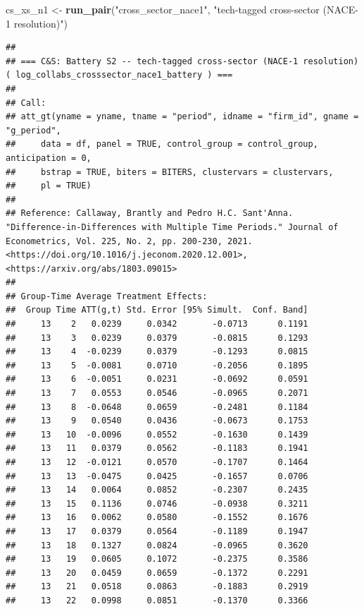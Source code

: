 \documentclass[
]{article}
\newenvironment{Shaded}{\begin{snugshade}}{\end{snugshade}}
\newcommand{\FunctionTok}[1]{\textcolor[rgb]{0.13,0.29,0.53}{\textbf{#1}}}
\newcommand{\NormalTok}[1]{#1}
\newcommand{\OtherTok}[1]{\textcolor[rgb]{0.56,0.35,0.01}{#1}}
\newcommand{\StringTok}[1]{\textcolor[rgb]{0.31,0.60,0.02}{#1}}
\begin{document}
\begin{Shaded}
\begin{Highlighting}[]
\NormalTok{cs\_xs\_n1 }\OtherTok{\textless{}{-}} \FunctionTok{run\_pair}\NormalTok{(}\StringTok{"cross\_sector\_nace1"}\NormalTok{, }\StringTok{"tech{-}tagged cross{-}sector (NACE{-}1 resolution)"}\NormalTok{)}
\end{Highlighting}
\end{Shaded}

\begin{verbatim}
## 
## === C&S: Battery S2 -- tech-tagged cross-sector (NACE-1 resolution) ( log_collabs_crosssector_nace1_battery ) ===
## 
## Call:
## att_gt(yname = yname, tname = "period", idname = "firm_id", gname = "g_period", 
##     data = df, panel = TRUE, control_group = control_group, anticipation = 0, 
##     bstrap = TRUE, biters = BITERS, clustervars = clustervars, 
##     pl = TRUE)
## 
## Reference: Callaway, Brantly and Pedro H.C. Sant'Anna.  "Difference-in-Differences with Multiple Time Periods." Journal of Econometrics, Vol. 225, No. 2, pp. 200-230, 2021. <https://doi.org/10.1016/j.jeconom.2020.12.001>, <https://arxiv.org/abs/1803.09015> 
## 
## Group-Time Average Treatment Effects:
##  Group Time ATT(g,t) Std. Error [95% Simult.  Conf. Band]  
##     13    2   0.0239     0.0342       -0.0713      0.1191  
##     13    3   0.0239     0.0379       -0.0815      0.1293  
##     13    4  -0.0239     0.0379       -0.1293      0.0815  
##     13    5  -0.0081     0.0710       -0.2056      0.1895  
##     13    6  -0.0051     0.0231       -0.0692      0.0591  
##     13    7   0.0553     0.0546       -0.0965      0.2071  
##     13    8  -0.0648     0.0659       -0.2481      0.1184  
##     13    9   0.0540     0.0436       -0.0673      0.1753  
##     13   10  -0.0096     0.0552       -0.1630      0.1439  
##     13   11   0.0379     0.0562       -0.1183      0.1941  
##     13   12  -0.0121     0.0570       -0.1707      0.1464  
##     13   13  -0.0475     0.0425       -0.1657      0.0706  
##     13   14   0.0064     0.0852       -0.2307      0.2435  
##     13   15   0.1136     0.0746       -0.0938      0.3211  
##     13   16   0.0062     0.0580       -0.1552      0.1676  
##     13   17   0.0379     0.0564       -0.1189      0.1947  
##     13   18   0.1327     0.0824       -0.0965      0.3620  
##     13   19   0.0605     0.1072       -0.2375      0.3586  
##     13   20   0.0459     0.0659       -0.1372      0.2291  
##     13   21   0.0518     0.0863       -0.1883      0.2919  
##     13   22   0.0998     0.0851       -0.1370      0.3366  

\end{verbatim}
\end{document}
